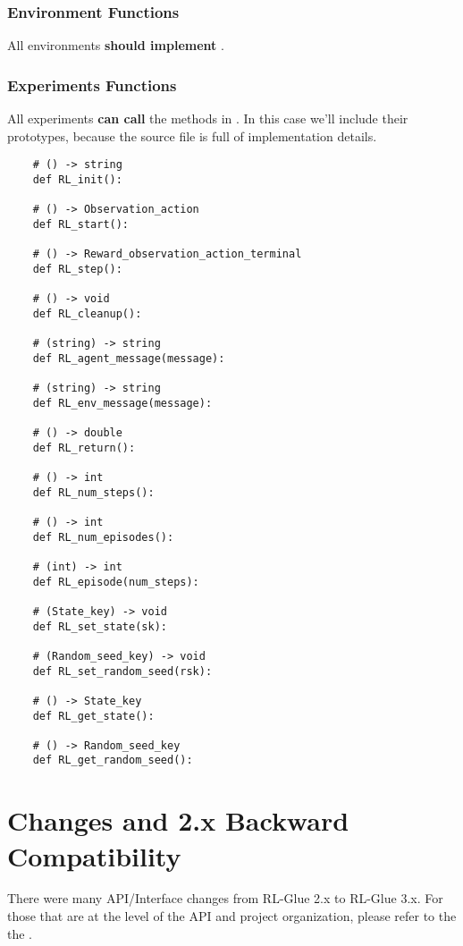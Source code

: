 \documentclass[11pt]{article}
\begin{document}
\subsubsection{Environment Functions}
All environments \textbf{should implement} .

\subsubsection{Experiments Functions}
All experiments \textbf{can call} the methods in .
In this case we'll include their prototypes, because the source file is full of implementation details.

\begin{verbatim}
	# () -> string
	def RL_init():

	# () -> Observation_action
	def RL_start():

	# () -> Reward_observation_action_terminal
	def RL_step():

	# () -> void
	def RL_cleanup():

	# (string) -> string
	def RL_agent_message(message):

	# (string) -> string
	def RL_env_message(message):

	# () -> double
	def RL_return():

	# () -> int
	def RL_num_steps():

	# () -> int
	def RL_num_episodes():

	# (int) -> int
	def RL_episode(num_steps):

	# (State_key) -> void
	def RL_set_state(sk):

	# (Random_seed_key) -> void
	def RL_set_random_seed(rsk):

	# () -> State_key
	def RL_get_state():

	# () -> Random_seed_key
	def RL_get_random_seed():
\end{verbatim}

\section{Changes and 2.x Backward Compatibility}
There were many API/Interface changes from RL-Glue 2.x to RL-Glue 3.x.  For those that are at the level of the API and project organization, please refer to the the .
\end{document}
